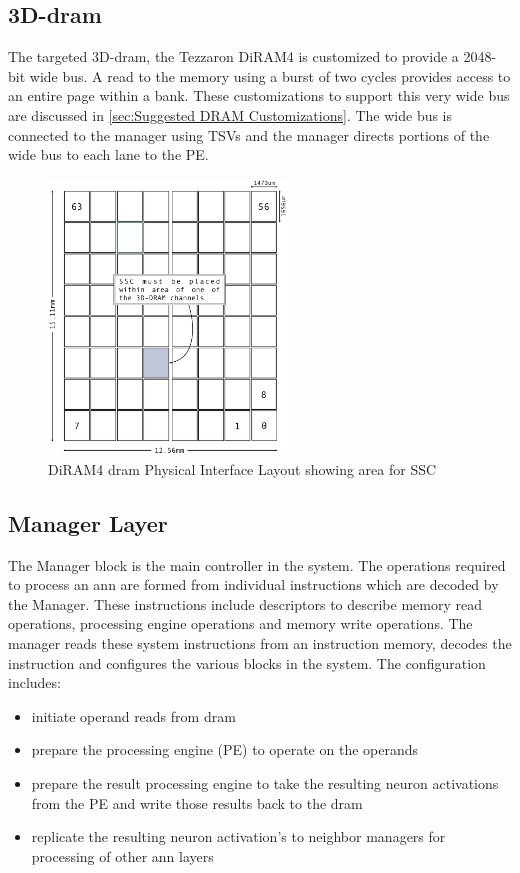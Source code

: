 \documentclass[journal]{IEEEtran}
\begin{document}
\subsection{3D-\ac{dram}}
The targeted 3D-\ac{dram}, the Tezzaron DiRAM4 is customized to provide a 2048-bit wide bus. A read to the memory using a burst of two cycles provides access to an entire page within a bank.
These customizations to support this very wide bus are discussed in \ref{sec:Suggested DRAM Customizations}.
The wide bus is connected to the manager using TSVs and the manager directs portions of the wide bus to each lane to the PE.
\begin{figure}[!t]
\captionsetup{width=.9\linewidth}
\centerline{
\mbox{\includegraphics[width=2.5in]{DiRAM4Layout.jpg}}
}
\caption{DiRAM4 \ac{dram} Physical Interface Layout\cite{tezzaron:diram4}\cite{patti2014} showing area for SSC }
\label{fig:diram4Layout}
\end{figure}


\subsection{Manager Layer}
The Manager block is the main controller in the system. The operations required to process an \ac{ann} are formed from individual instructions which are decoded by the Manager. 
These instructions include descriptors to describe memory read operations, processing engine operations and memory write operations. The manager reads these system instructions from an instruction memory, decodes the instruction and configures the various blocks in the system.
The configuration includes:
\begin{itemize}

      \item initiate operand reads from \ac{dram}
      \item prepare the processing engine (PE) to operate on the operands
      \item prepare the result processing engine to take the resulting neuron activations from the PE and write those results back to the \ac{dram}
      \item replicate the resulting neuron activation's to neighbor managers for processing of other \ac{ann} layers

\end{itemize}
\end{document}
